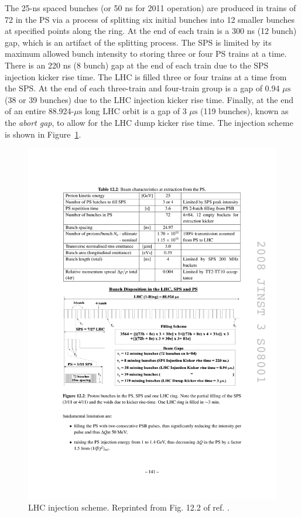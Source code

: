 \documentclass[dissertation.tex]{subfiles}
\begin{document}
The 25-ns spaced bunches (or 50 ns for 2011 operation) are produced in trains of 72 in the PS via a process of splitting six initial bunches into 12 smaller bunches at specified points along the ring.  At the end of each train is a 300 ns (12 bunch) gap, which is an artifact of the splitting process.  The SPS is limited by its maximum allowed bunch intensity to storing three or four PS trains at a time.  There is an 220 ns (8 bunch) gap at the end of each train due to the SPS injection kicker rise time.  The LHC is filled three or four trains at a time from the SPS.  At the end of each three-train and four-train group is a gap of 0.94 $\mu\mbox{s}$ (38 or 39 bunches) due to the LHC injection kicker rise time.  Finally, at the end of an entire 88.924-$\mu\mbox{s}$ long LHC orbit is a gap of 3 $\mu\mbox{s}$ (119 bunches), known as the \textit{abort gap}, to allow for the LHC dump kicker rise time.  The injection scheme is shown in Figure~\ref{fig:LHC_injection_scheme}.

\begin{figure}
	\centering
	\includegraphics[scale=1.0]{LHC_injection_scheme}
	\caption{LHC injection scheme.  Reprinted from Fig. 12.2 of ref. \cite{1748-0221-3-08-S08001}.}
	\label{fig:LHC_injection_scheme}
\end{figure}
\end{document}
